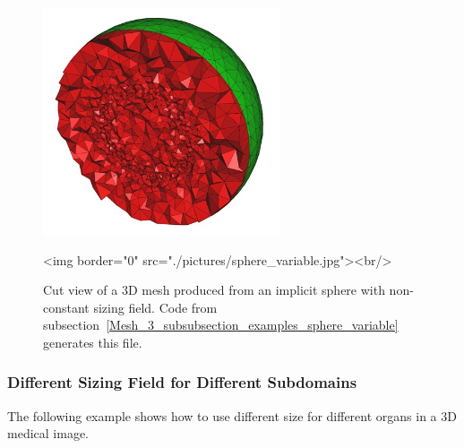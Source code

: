 
\begin{figure}[ht]
\begin{center}
 \begin{ccTexOnly}
   \includegraphics[width=7cm]{Mesh_3/pictures/sphere_variable}
 \end{ccTexOnly}
 \begin{ccHtmlOnly}
   <img border="0" src="./pictures/sphere_variable.jpg"><br/>
 \end{ccHtmlOnly}
 \caption{Cut view of a 3D mesh produced from an implicit sphere with non-constant
 sizing field. Code from
 subsection~\ref{Mesh_3_subsubsection_examples_sphere_variable} generates this file.}
  \label{figure:sphere_variable_mesh}
\end{center}
\end{figure}

\subsubsection{Different Sizing Field for Different Subdomains}
\label{Mesh_3_subsubsection_examples_3d_image_variable}

The following example shows how to use different size for different organs in
a 3D medical image.


